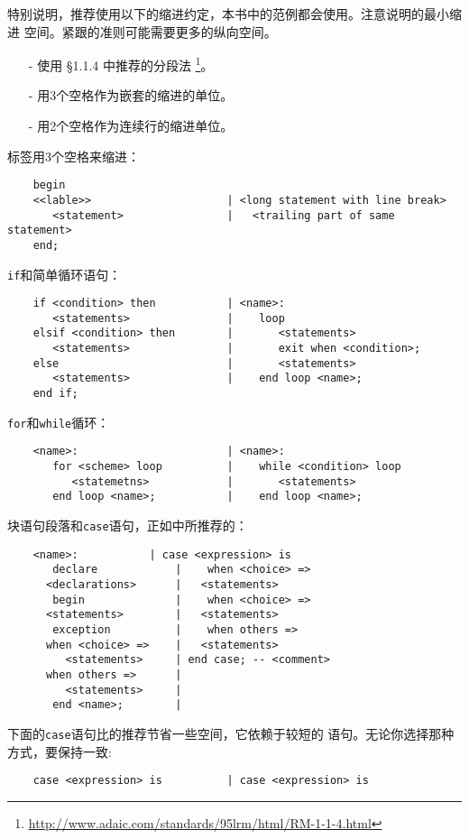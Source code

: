 \begin{blockindent}
特别说明，推荐使用以下的缩进约定，本书中的范例都会使用。注意说明的最小缩进
空间。紧跟的准则可能需要更多的纵向空间。
\begin{itemize}
    \item[-] 使用\cite{arm95} \S{}1.1.4 中推荐的分段法
\footnote{\url{http://www.adaic.com/standards/95lrm/html/RM-1-1-4.html}}。
    \item[-] 用3个空格作为嵌套的缩进的单位。
    \item[-] 用2个空格作为连续行的缩进单位。
\end{itemize}

标签用3个空格来缩进：
\begin{lstlisting}
    begin
    <<lable>>                     | <long statement with line break>
       <statement>                |   <trailing part of same statement>
    end;
\end{lstlisting}
\texttt{if}和简单循环语句：
\begin{lstlisting}
    if <condition> then           | <name>:
       <statements>               |    loop
    elsif <condition> then        |       <statements>
       <statements>               |       exit when <condition>;
    else                          |       <statements>
       <statements>               |    end loop <name>;
    end if;
\end{lstlisting}
\texttt{for}和\texttt{while}循环：
\begin{lstlisting}
    <name>:                       | <name>:
       for <scheme> loop          |    while <condition> loop
          <statemetns>            |       <statements>
       end loop <name>;           |    end loop <name>;
\end{lstlisting}
块语句段落和\texttt{case}语句，正如\cite{arm95}中所推荐的：
\begin{lstlisting}
    <name>:			  | case <expression> is
       declare			  |    when <choice> =>
	  <declarations>	  |	  <statements>
       begin			  |    when <choice> =>
	  <statements>		  |	  <statements>
       exception		  |    when others =>
	  when <choice> =>	  |	  <statements>
	     <statements>	  | end case; -- <comment>
	  when others =>	  |
	     <statements>	  |
       end <name>;		  |
\end{lstlisting}
下面的\texttt{case}语句比\cite{arm95}的推荐节省一些空间，它依赖于较短的
语句。无论你选择那种方式，要保持一致:
\begin{lstlisting}
    case <expression> is          | case <expression> is

\end{lstlisting}
\end{blockindent}

